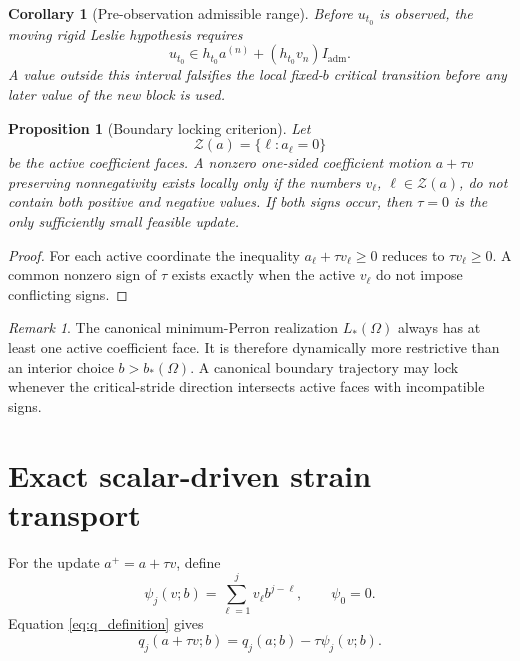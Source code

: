 \documentclass[11pt]{amsart}
\numberwithin{equation}{section}
\theoremstyle{plain}
\newtheorem{proposition}[theorem]{Proposition}
\newtheorem{corollary}[theorem]{Corollary}
\theoremstyle{definition}
\theoremstyle{remark}
\newtheorem{remark}[theorem]{Remark}
\begin{document}
\begin{corollary}[Pre-observation admissible range]
\label{cor:first_value_admissible_range}
Before $u_{t_0}$ is observed, the moving rigid Leslie hypothesis requires
\begin{equation}
\boxed{
 u_{t_0}
 \in
 h_{t_0}a^{(n)}
 +(h_{t_0}v_n)I_{\mathrm{adm}}.
}
\label{eq:first_value_allowed_interval}
\end{equation}
A value outside this interval falsifies the local fixed-$b$ critical transition before any later value of the new block is used.
\end{corollary}

\begin{proposition}[Boundary locking criterion]
\label{prop:boundary_locking}
Let
\begin{equation}
\mathcal Z(a)=\{\ell:a_\ell=0\}
\label{eq:active_zero_set}
\end{equation}
be the active coefficient faces.  A nonzero one-sided coefficient motion $a+\tau v$ preserving nonnegativity exists locally only if the numbers $v_\ell$, $\ell\in\mathcal Z(a)$, do not contain both positive and negative values.  If both signs occur, then $\tau=0$ is the only sufficiently small feasible update.
\end{proposition}

\begin{proof}
For each active coordinate the inequality $a_\ell+\tau v_\ell\geq0$ reduces to $\tau v_\ell\geq0$.  A common nonzero sign of $\tau$ exists exactly when the active $v_\ell$ do not impose conflicting signs.
\end{proof}

\begin{remark}
\label{rem:minimum_perron_locking}
The canonical minimum-Perron realization $L_*(\Omega)$ always has at least one active coefficient face.  It is therefore dynamically more restrictive than an interior choice $b>b_*(\Omega)$.  A canonical boundary trajectory may lock whenever the critical-stride direction intersects active faces with incompatible signs.
\end{remark}

\section{Exact scalar-driven strain transport}
\label{sec:scalar_strain_transport}

For the update $a^+=a+\tau v$, define
\begin{equation}
\psi_j(v;b)
=
\sum_{\ell=1}^{j}v_\ell b^{j-\ell},
\qquad
\psi_0=0.
\label{eq:psi_definition}
\end{equation}
Equation \eqref{eq:q_definition} gives
\begin{equation}
q_j(a+\tau v;b)=q_j(a;b)-\tau\psi_j(v;b).
\label{eq:q_scalar_update}
\end{equation}
\end{document}
